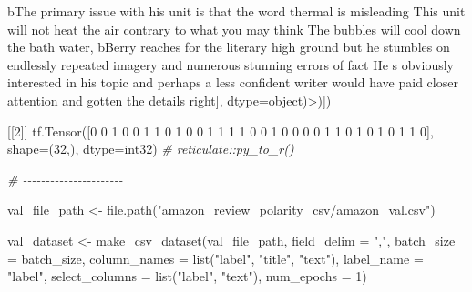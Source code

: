 \documentclass[
]{article}
\newenvironment{Shaded}{}{}
\newcommand{\AttributeTok}[1]{\textcolor[rgb]{0.49,0.56,0.16}{#1}}
\newcommand{\CommentTok}[1]{\textcolor[rgb]{0.38,0.63,0.69}{\textit{#1}}}
\newcommand{\DecValTok}[1]{\textcolor[rgb]{0.25,0.63,0.44}{#1}}
\newcommand{\FunctionTok}[1]{\textcolor[rgb]{0.02,0.16,0.49}{#1}}
\newcommand{\NormalTok}[1]{#1}
\newcommand{\OtherTok}[1]{\textcolor[rgb]{0.00,0.44,0.13}{#1}}
\newcommand{\SpecialCharTok}[1]{\textcolor[rgb]{0.25,0.44,0.63}{#1}}
\newcommand{\StringTok}[1]{\textcolor[rgb]{0.25,0.44,0.63}{#1}}
\begin{document}
\begin{Shaded}
\begin{Highlighting}[]
\NormalTok{       b}\StringTok{\textquotesingle{}The primary issue with his unit is that the word thermal is misleading This unit will not heat the air contrary to what you may think The bubbles will cool down the bath water\textquotesingle{}}\NormalTok{,}
\NormalTok{       b}\StringTok{\textquotesingle{}Berry reaches for the literary high ground but he stumbles on endlessly repeated imagery and numerous stunning errors of fact He s obviously interested in his topic and perhaps a less confident writer would have paid closer attention and gotten the details right\textquotesingle{}}\NormalTok{],}
      \AttributeTok{dtype=}\NormalTok{object)}\SpecialCharTok{\textgreater{}}\NormalTok{)])}

\NormalTok{[[}\DecValTok{2}\NormalTok{]]}
\FunctionTok{tf.Tensor}\NormalTok{([}\DecValTok{0} \DecValTok{0} \DecValTok{1} \DecValTok{0} \DecValTok{0} \DecValTok{1} \DecValTok{1} \DecValTok{0} \DecValTok{1} \DecValTok{0} \DecValTok{0} \DecValTok{1} \DecValTok{1} \DecValTok{1} \DecValTok{1} \DecValTok{0} \DecValTok{0} \DecValTok{1} \DecValTok{0} \DecValTok{0} \DecValTok{0} \DecValTok{0} \DecValTok{1} \DecValTok{1} \DecValTok{0} \DecValTok{1} \DecValTok{0} \DecValTok{1} \DecValTok{0} \DecValTok{1} \DecValTok{1} \DecValTok{0}\NormalTok{], }\AttributeTok{shape=}\NormalTok{(}\DecValTok{32}\NormalTok{,), }\AttributeTok{dtype=}\NormalTok{int32)}
\CommentTok{\# reticulate::py\_to\_r()}

\CommentTok{\# {-}{-}{-}{-}{-}{-}{-}{-}{-}{-}{-}{-}{-}{-}{-}{-}{-}{-}{-}{-}{-}{-}}

\NormalTok{val\_file\_path }\OtherTok{\textless{}{-}} \FunctionTok{file.path}\NormalTok{(}\StringTok{"amazon\_review\_polarity\_csv/amazon\_val.csv"}\NormalTok{)}

\NormalTok{val\_dataset }\OtherTok{\textless{}{-}} \FunctionTok{make\_csv\_dataset}\NormalTok{(val\_file\_path, }\AttributeTok{field\_delim =} \StringTok{","}\NormalTok{, }\AttributeTok{batch\_size =}\NormalTok{ batch\_size,}
    \AttributeTok{column\_names =} \FunctionTok{list}\NormalTok{(}\StringTok{"label"}\NormalTok{, }\StringTok{"title"}\NormalTok{, }\StringTok{"text"}\NormalTok{), }\AttributeTok{label\_name =} \StringTok{"label"}\NormalTok{, }\AttributeTok{select\_columns =} \FunctionTok{list}\NormalTok{(}\StringTok{"label"}\NormalTok{,}
        \StringTok{"text"}\NormalTok{), }\AttributeTok{num\_epochs =} \DecValTok{1}\NormalTok{)}



\end{Highlighting}
\end{Shaded}
\end{document}
